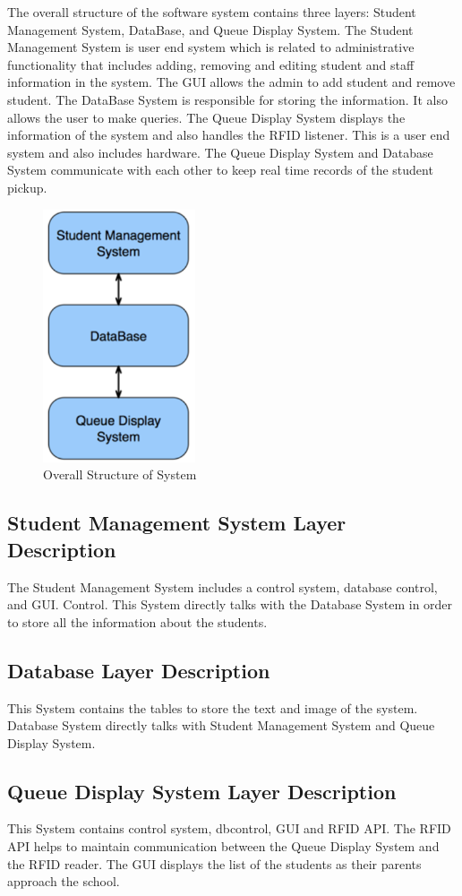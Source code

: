 \quad \quad The overall structure of the software system contains three layers: Student Management 
System, DataBase, and Queue Display System. The Student Management System is user end 
system which is related to administrative functionality that includes adding, removing 
and editing student and staff information in the system. The GUI allows the admin to 
add student and remove student. The DataBase System is responsible for storing the 
information. It also allows the user to make queries. The Queue Display System displays 
the information of the system and also handles the RFID listener. This is a user end 
system and also includes hardware. The Queue Display System and Database System 
communicate with each other to keep real time records of the student pickup.

\begin{figure}[h!]
	\centering
 	\includegraphics[width=0.40\textwidth]{images/ads_1}
 \caption{Overall Structure of System}
\end{figure}

\subsection{Student Management System Layer Description}
\quad \quad The Student Management System includes a control system, database control, and GUI. 
Control. This System directly talks with the Database System in order to store all the 
information about the students.

\subsection{Database Layer Description}
\quad \quad This System contains the tables to store the text and image of the system. Database 
System directly talks with Student Management System and Queue Display System.

\subsection{Queue Display System Layer Description}
\quad \quad This System contains control system, dbcontrol, GUI and RFID API. The RFID API helps 
to maintain communication between the Queue Display System and the RFID reader. The 
GUI displays the list of the students as their parents approach the school.